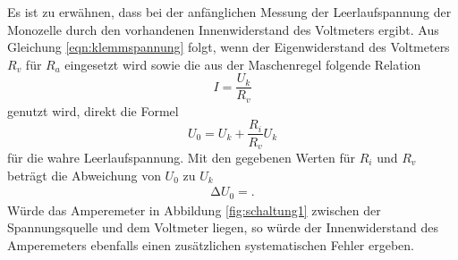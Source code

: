 Es ist zu erwähnen, dass bei der anfänglichen Messung der Leerlaufspannung der Monozelle durch den vorhandenen Innenwiderstand des Voltmeters ergibt.
Aus Gleichung \ref{eqn:klemmspannung} folgt, wenn der Eigenwiderstand des Voltmeters $R_v$ für $R_a$ eingesetzt wird sowie die aus der Maschenregel folgende Relation
\begin{equation}
  I = \frac{U_k}{R_v}
\end{equation}
genutzt wird, direkt die Formel
\begin{equation}
  U_0 = U_k + \frac{R_i}{R_v}U_k
\end{equation}
für die wahre Leerlaufspannung.
Mit den gegebenen Werten für $R_i$ und $R_v$ beträgt die Abweichung von $U_0$ zu $U_k$
\begin{align*}
  \increment{U_0} = .
\end{align*}
Würde das Amperemeter in Abbildung \ref{fig:schaltung1} zwischen der Spannungsquelle und dem Voltmeter liegen, so würde der Innenwiderstand des Amperemeters ebenfalls einen zusätzlichen systematischen Fehler ergeben.
